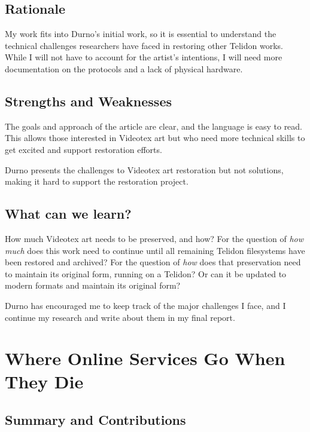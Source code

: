 \documentclass[sigconf]{acmart}
\begin{document}
 

\subsection{Rationale}

My work fits into Durno's initial work, so it is essential to understand the technical challenges researchers have faced in restoring other Telidon works. While I will not have to account for the artist's intentions, I will need more documentation on the protocols and a lack of physical hardware. 
 

\subsection{Strengths and Weaknesses}

The goals and approach of the article are clear, and the language is easy to read. This allows those interested in Videotex art but who need more technical skills to get excited and support restoration efforts. 

Durno presents the challenges to Videotex art restoration but not solutions, making it hard to support the restoration project. 

\subsection{What can we learn?}

How much Videotex art needs to be preserved, and how? For the question of \emph{how much} does this work need to continue until all remaining Telidon filesystems have been restored and archived? For the question of \emph{how} does that preservation need to maintain its original form, running on a Telidon? Or can it be updated to modern formats and maintain its original form?

Durno has encouraged me to keep track of the major challenges I face, and I continue my research and write about them in my final report.

\section{Where Online Services Go When They Die}


\subsection{Summary and Contributions}
\end{document}
